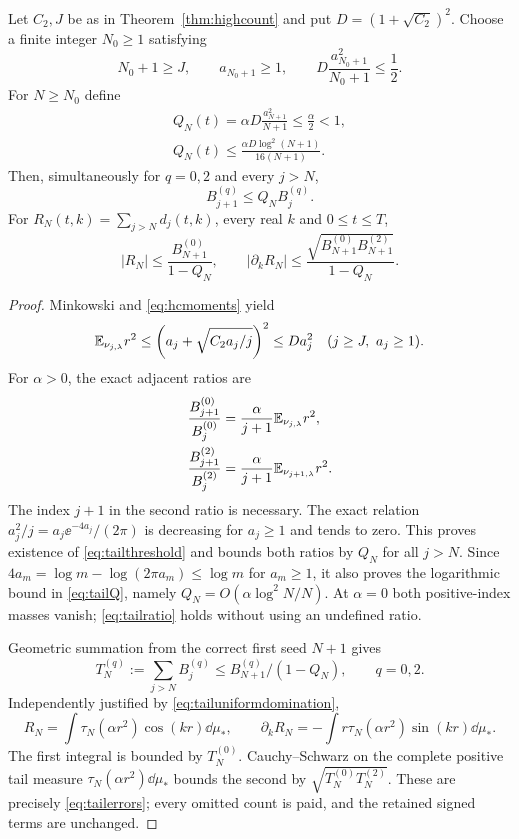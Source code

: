 \begin{theorem}\label{thm:counttail}
Let $C_2,J$ be as in Theorem~\ref{thm:highcount} and put
$D=(1+\sqrt{C_2})^2$. Choose a finite integer $N_0\ge1$ satisfying
\begin{equation}\label{eq:tailthreshold}
 N_0+1\ge J,\qquad a_{N_0+1}\ge1,\qquad
 D\frac{a_{N_0+1}^2}{N_0+1}\le\frac12.
\end{equation}
For $N\ge N_0$ define
\begin{equation}\label{eq:tailQ}
 \begin{gathered}
 Q_N(t)=\alpha D\frac{a_{N+1}^2}{N+1}\le\frac{\alpha}{2}<1,\\
 Q_N(t)\le\frac{\alpha D\log^2(N+1)}{16(N+1)}.
 \end{gathered}
\end{equation}
Then, simultaneously for $q=0,2$ and every $j>N$,
\begin{equation}\label{eq:tailratio}
 B_{j+1}^{(q)}\le Q_NB_j^{(q)}.
\end{equation}
For $R_N(t,k)=\sum_{j>N}d_j(t,k)$, every real $k$ and $0\le t\le T$,
\begin{equation}\label{eq:tailerrors}
 |R_N|\le\frac{B_{N+1}^{(0)}}{1-Q_N},\qquad
 |\partial_kR_N|\le
 \frac{\sqrt{B_{N+1}^{(0)}B_{N+1}^{(2)}}}{1-Q_N}.
\end{equation}
\end{theorem}
\begin{proof}
Minkowski and \eqref{eq:hcmoments} yield
\[
 \mathbb E_{\nu_{j,\lambda}}r^2
 \le\left(a_j+\sqrt{C_2a_j/j}\right)^2\le Da_j^2
 \quad(j\ge J,\ a_j\ge1).
\]
For $\alpha>0$, the exact adjacent ratios are
\begin{equation}\label{eq:tailadjacent}
 \begin{aligned}
 \frac{B_{j+1}^{(0)}}{B_j^{(0)}}
 &=\frac\alpha{j+1}\mathbb E_{\nu_{j,\lambda}}r^2,\\
 \frac{B_{j+1}^{(2)}}{B_j^{(2)}}
 &=\frac\alpha{j+1}\mathbb E_{\nu_{j+1,\lambda}}r^2.
 \end{aligned}
\end{equation}
The index $j+1$ in the second ratio is necessary. The exact relation
$a_j^2/j=a_j\ee^{-4a_j}/(2\pi)$ is decreasing for $a_j\ge1$ and tends
to zero. This proves existence of \eqref{eq:tailthreshold} and bounds
both ratios by $Q_N$ for all $j>N$. Since
$4a_m=\log m-\log(2\pi a_m)\le\log m$ for $a_m\ge1$, it also proves
the logarithmic bound in \eqref{eq:tailQ}, namely
$Q_N=O(\alpha\log^2N/N)$. At $\alpha=0$ both positive-index masses
vanish; \eqref{eq:tailratio} holds without using an undefined ratio.

Geometric summation from the correct first seed $N+1$ gives
\[
 T_N^{(q)}:=\sum_{j>N}B_j^{(q)}
 \le B_{N+1}^{(q)}/(1-Q_N),\qquad q=0,2.
\]
Independently justified by \eqref{eq:tailuniformdomination},
\[
 R_N=\int\tau_N(\alpha r^2)\cos(kr)\dd\mu_*,\qquad
 \partial_kR_N=-\int r\tau_N(\alpha r^2)\sin(kr)\dd\mu_*.
\]
The first integral is bounded by $T_N^{(0)}$. Cauchy--Schwarz on the
complete positive tail measure $\tau_N(\alpha r^2)\dd\mu_*$ bounds the
second by $\sqrt{T_N^{(0)}T_N^{(2)}}$. These are precisely
\eqref{eq:tailerrors}; every omitted count is paid, and the retained
signed terms are unchanged.
\end{proof}

